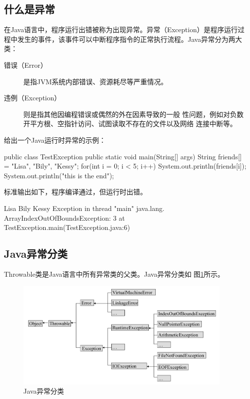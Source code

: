 \subsection{什么是异常}

在Java语言中，程序运行出错被称为出现异常。异常（Exception）是程序运行过
程中发生的事件，该事件可以中断程序指令的正常执行流程。Java异常分为两大类：

\begin{description}
\item[错误（Error）] 是指JVM系统内部错误、资源耗尽等严重情况。
\item[违例（Exception）] 则是指其他因编程错误或偶然的外在因素导致的一般
  性问题，例如对负数开平方根、空指针访问、试图读取不存在的文件以及网络
  连接中断等。
\end{description}

给出一个Java运行时异常的示例：


\begin{javaCode}
public class TestException {
  public static void main(String[] args) {
    String friends[] = {"Lisa", "Bily", "Kessy"};
    for(int i = 0; i < 5; i++) {
      System.out.println(friends[i]);
    }
    System.out.println("\n this is the end");
  }
}
\end{javaCode}

标准输出如下，程序编译通过，但运行时出错。

\begin{stdoutCode}
Lisa
Bily
Kessy
Exception in thread "main" java.lang.
ArrayIndexOutOfBoundsException: 3
at TestException.main(TestException.java:6)
\end{stdoutCode}

\subsection{Java异常分类}
 
Throwable类是Java语言中所有异常类的父类。Java异常分类如
图\ref{fig:exception-class}所示。

\begin{figure}[h]
\centering
\includegraphics[width=0.95\textwidth]{images/Java-exception-handling/fig-exception-class.png}
\caption{Java异常分类}
\label{fig:exception-class}
\end{figure}

